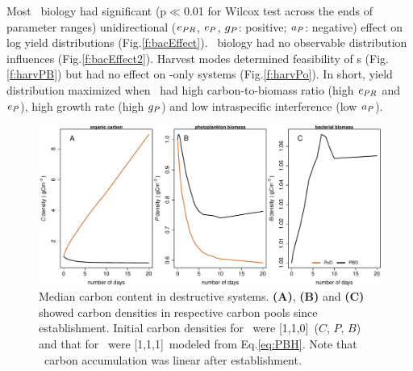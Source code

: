 \documentclass[../thesis.tex]{subfiles} %
\begin{document}
Most \phy\ biology had significant (p$\ll$0.01 for Wilcox test across the ends of parameter ranges) unidirectional ($e_{PR}$, $e_P$, $g_P$: positive; $a_P$: negative) effect on log yield distributions (Fig.\ref{f:bacEffect}).  \Bac\ biology had no observable distribution influences (Fig.\ref{f:bacEffect2}).  Harvest modes determined feasibility of \pbs s (Fig.\ref{f:harvPB}) but had no effect on \phy-only systems (Fig.\ref{f:harvPo}).  In short, yield distribution maximized when \phy\ had high carbon-to-biomass ratio (high $e_{PR}$ and $e_P$), high growth rate (high $g_P$) and low intraspecific interference (low $a_P$).

\begin{figure}[H]
    \centering
    \includegraphics[width=\linewidth]{result/Sample.pdf}
    \caption[Median carbon content in destructive systems]{Median carbon content in destructive systems.  \textbf{(A)}, \textbf{(B)} and \textbf{(C)} showed carbon densities in respective carbon pools since establishment.  Initial carbon densities for \PoN\ were [1,1,0]\den\ ($C$, $P$, $B$) and that for \PBN\ were [1,1,1]\den\ modeled from Eq.\ref{eq:PBH}.  Note that \PoN\ carbon accumulation was linear after establishment.}
    \label{f:destCarbon}
\end{figure}
\end{document}
